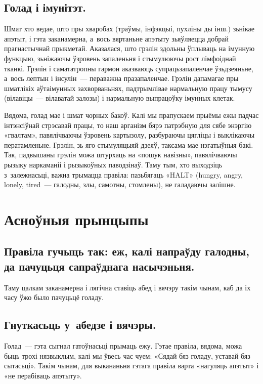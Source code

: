 
\subsection{Голад і імунітэт.}
Шмат хто ведае, што пры хваробах (траўмы, інфэкцыі, пухліны ды інш.) зьнікае апэтыт, і гэта заканамерна, а~вось вяртаньне апэтыту зьяўляецца добрай прагнастычнай прыкметай. Аказалася, што грэлін здольны ўплываць на імунную функцыю, зьніжаючы ўзровень запаленьня і стымулюючы рост лімфоіднай тканкі. Грэлін і самататропны гармон аказваюць супрацьзапаленчае ўзьдзеяньне, а~вось лептын і інсулін~--- пераважна празапаленчае. Грэлін дапамагае пры шматлікіх аўтаімунных захворваньнях, падтрымлівае нармальную працу тымусу (вілавіцы~--- вілаватай залозы) і нармальную выпрацоўку імунных клетак.

Вядома, голад мае і шмат чорных бакоў. Калі мы прапускаем прыёмы ежы падчас інтэнсіўнай стрэсавай працы, то наш арганізм бярэ патрэбную для сябе энэргію «гвалтам», павялічваючы ўзровень картызолу, разбураючы цягліцы і выклікаючы ператамленьне. Грэлін, зь яго стымуляцыяй дзеяў, таксама мае нэгатыўныя бакі. Так, падвышаны грэлін можа штурхаць на «пошук навізны», павялічваючы рызыку наркаманіі і рызыкоўных паводзінаў. Таму тым, хто выходзіць з~залежнасьці, важна трымацца правіла: пазьбягаць «HALT» (hungry, angry, lonely, tired~--- галодны, злы, самотны, стомлены), не галадаючы залішне.

\section{Асноўныя прынцыпы}

\subsection{Правіла гучыць так: еж, калі напраўду галодны, да пачуцьця сапраўднага насычэньня.}
Таму цалкам заканамерна і лягічна ставіць абед і вячэру такім чынам, каб да іх часу ўжо было пачуцьцё голаду.

\subsection{Гнуткасьць у~абедзе і вячэры.}
Голад~--- гэта сыгнал гатоўнасьці прымаць ежу. Гэтае правіла, вядома, можа быць трохі нязвыклым, калі мы ўвесь час чуем: «Сядай бяз голаду, уставай бяз сытасьці». Такім чынам, для выкананьня гэтага правіла варта «нагуляць апэтыт» і «не перабіваць апэтыту».

